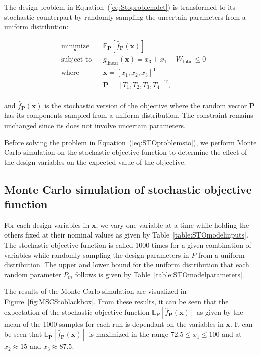 The design problem in Equation~(\ref{eq:Stoproblemdet}) is transformed to its stochastic counterpart by randomly sampling the uncertain parameters from a uniform distribution:

\begin{equation}
	\begin{aligned}
		& \underset{\mathbf{x}}{\text{minimize}}
		& & \mathbb{E}_{\mathbf{P}}\left[\hat{f}_{\mathbf{P}}(\mathbf{x})\right]\\
		& \text{subject to}
		& & {g_{\textrm{linear}}}(\mathbf{x}) = x_3 + x_1 - W_{\textrm{total}} \le 0\\
        & \text{where}
        & & \mathbf{x} = \left[x_1,x_2,x_3\right]^{\textrm{T}}\\
        & & & \mathbf{P} = \left[T_1,T_2,T_3,T_4\right]^{\textrm{T}},\\
	\end{aligned}
	\label{eq:STOproblemsto}
\end{equation}

and $\hat{f}_{\mathbf{P}}(\mathbf{x})$ is the stochastic version of the objective where the random vector $\mathbf{P}$ has its components sampled from a uniform distribution. The constraint remains unchanged since its does not involve uncertain parameters.

Before solving the problem in Equation~(\ref{eq:STOproblemsto}), we perform Monte Carlo simulation on the stochastic objective function to determine the effect of the design variables on the expected value of the objective.

\subsection{Monte Carlo simulation of stochastic objective function} \label{subsec:MCSsto}


For each design variables in $\mathbf{x}$, we vary one variable at a time while holding the others fixed at their nominal values as given by Table~\ref{table:STOmodelinputs}. The stochastic objective function is called $1000$ times for a given combination of variables while randomly sampling the design parameters in $P$ from a uniform distribution. The upper and lower bound for the uniform distribution that each random parameter $P_m$ follows is given by Table~\ref{table:STOmodelparameters}.

The results of the Monte Carlo simulation are visualized in Figure~\ref{fig:MSCStoblackbox}. From these results, it can be seen that the expectation of the stochastic objective function $\mathbb{E}_{\mathbf{P}}\left[\hat{f}_{\mathbf{P}}(\mathbf{x})\right]$ as given by the mean of the 1000 samples for each run is dependant on the variables in $\mathbf{x}$. It can be seen that $\mathbb{E}_{\mathbf{P}}\left[\hat{f}_{\mathbf{P}}(\mathbf{x})\right]$ is maximized in the range $ 72.5 \le x_1 \le 100 $ and at $x_2 \approx 15$ and $x_3 \approx 87.5$.


